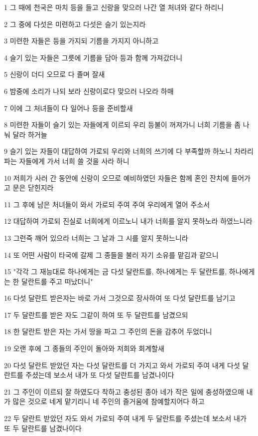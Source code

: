 \par 1 그 때에 천국은 마치 등을 들고 신랑을 맞으러 나간 열 처녀와 같다 하리니
\par 2 그 중에 다섯은 미련하고 다섯은 슬기 있는지라
\par 3 미련한 자들은 등을 가지되 기름을 가지지 아니하고
\par 4 슬기 있는 자들은 그릇에 기름을 담아 등과 함께 가져갔더니
\par 5 신랑이 더디 오므로 다 졸며 잘새
\par 6 밤중에 소리가 나되 보라 신랑이로다 맞으러 나오라 하매
\par 7 이에 그 처녀들이 다 일어나 등을 준비할새
\par 8 미련한 자들이 슬기 있는 자들에게 이르되 우리 등불이 꺼져가니 너희 기름을 좀 나눠 달라 하거늘
\par 9 슬기 있는 자들이 대답하여 가로되 우리와 너희의 쓰기에 다 부족할까 하노니 차라리 파는 자들에게 가서 너희 쓸 것을 사라 하니
\par 10 저희가 사러 간 동안에 신랑이 오므로 예비하였던 자들은 함께 혼인 잔치에 들어가고 문은 닫힌지라
\par 11 그 후에 남은 처녀들이 와서 가로되 주여 주여 우리에게 열어 주소서
\par 12 대답하여 가로되 진실로 너희에게 이르노니 내가 너희를 알지 못하노라 하였느니라
\par 13 그런즉 깨어 있으라 너희는 그 날과 그 시를 알지 못하느니라
\par 14 또 어떤 사람이 타국에 갈제 그 종들을 불러 자기 소유를 맡김과 같으니
\par 15 "각각 그 재능대로 하나에게는 금 다섯 달란트를, 하나에게는 두 달란트를, 하나에게는 한 달란트를 주고 떠났더니"
\par 16 다섯 달란트 받은자는 바로 가서 그것으로 장사하여 또 다섯 달란트를 남기고
\par 17 두 달란트를 받은 자도 그같이 하여 또 두 달란트를 남겼으되
\par 18 한 달란트 받은 자는 가서 땅을 파고 그 주인의 돈을 감추어 두었더니
\par 19 오랜 후에 그 종들의 주인이 돌아와 저희와 회계할새
\par 20 다섯 달란트 받았던 자는 다섯 달란트를 더 가지고 와서 가로되 주여 내게 다섯 달란트를 주셨는데 보소서 내가 또 다섯 달란트를 남겼나이다
\par 21 그 주인이 이르되 잘 하였도다 착하고 충성된 종아 네가 작은 일에 충성하였으매 내가 많은 것으로 네게 맡기리니 네 주인의 즐거움에 참예할지어다 하고
\par 22 두 달란트 받았던 자도 와서 가로되 주여 내게 두 달란트를 주셨는데 보소서 내가 또 두 달란트를 남겼나이다
